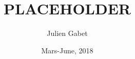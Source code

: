 \documentclass[a4paper]{article}
\title{PLACEHOLDER}
\author{Julien Gabet}
\date{Mars-June, 2018}
\begin{document}
\everymath{\displaystyle}

\maketitle










\end{document}
